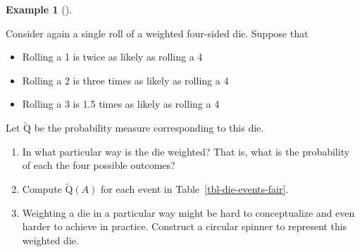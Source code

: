 \documentclass[
  letterpaper,
  DIV=11,
  numbers=noendperiod]{scrreprt}
\providecommand{\tightlist}{%
  \setlength{\itemsep}{0pt}\setlength{\parskip}{0pt}}
\theoremstyle{plain}
\theoremstyle{definition}
\newtheorem{example}{Example}[chapter]
\theoremstyle{definition}
\theoremstyle{definition}
\theoremstyle{remark}
\begin{document}
\begin{tcolorbox}[enhanced jigsaw, opacityback=0, left=2mm, colframe=quarto-callout-note-color-frame, toprule=.15mm, breakable, colback=white, leftrule=.75mm, arc=.35mm, rightrule=.15mm, bottomrule=.15mm]

\begin{example}[]\protect\hypertarget{exm-dice-normalize}{}\label{exm-dice-normalize}

Consider again a single roll of a weighted four-sided die. Suppose that

\begin{itemize}
\tightlist
\item
  Rolling a 1 is twice as likely as rolling a 4
\item
  Rolling a 2 is three times as likely as rolling a 4
\item
  Rolling a 3 is 1.5 times as likely as rolling a 4
\end{itemize}

Let \(\tilde{\textrm{Q}}\) be the probability measure corresponding to
this die.

\begin{enumerate}
\def\labelenumi{\arabic{enumi}.}
\tightlist
\item
  In what particular way is the die weighted? That is, what is the
  probability of each the four possible outcomes?
\item
  Compute \(\tilde{\textrm{Q}}(A)\) for each event in
  Table~\ref{tbl-die-events-fair}.
\item
  Weighting a die in a particular way might be hard to conceptualize and
  even harder to achieve in practice. Construct a circular spinner to
  represent this weighted die.
\end{enumerate}

\end{example}

\end{tcolorbox}
\end{document}
